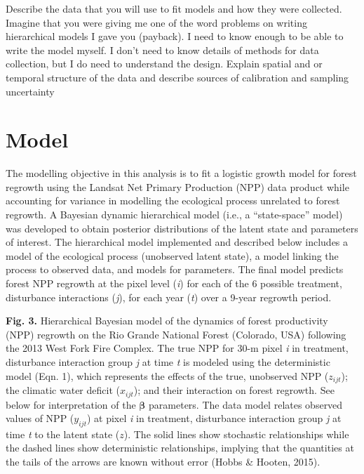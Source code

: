 \documentclass[
]{article}
\begin{document}
Describe the data that you will use to fit models and how they were
collected. Imagine that you were giving me one of the word problems on
writing hierarchical models I gave you (payback). I need to know enough
to be able to write the model myself. I don't need to know details of
methods for data collection, but I do need to understand the design.
Explain spatial and or temporal structure of the data and describe
sources of calibration and sampling uncertainty

\hypertarget{model}{%
\section{Model}\label{model}}

The modelling objective in this analysis is to fit a logistic growth
model for forest regrowth using the Landsat Net Primary Production (NPP)
data product while accounting for variance in modelling the ecological
process unrelated to forest regrowth. A Bayesian dynamic hierarchical
model (i.e., a ``state-space'' model) was developed to obtain posterior
distributions of the latent state and parameters of interest. The
hierarchical model implemented and described below includes a model of
the ecological process (unobserved latent state), a model linking the
process to observed data, and models for parameters. The final model
predicts forest NPP regrowth at the pixel level (\emph{i}) for each of
the 6 possible treatment, disturbance interactions (\emph{j}), for each
year (\emph{t}) over a 9-year regrowth period.

\textbf{Fig. 3.} Hierarchical Bayesian model of the dynamics of forest
productivity (NPP) regrowth on the Rio Grande National Forest (Colorado,
USA) following the 2013 West Fork Fire Complex. The true NPP for 30-m
pixel \emph{i} in treatment, disturbance interaction group \emph{j} at
time \emph{t} is modeled using the deterministic model (Eqn. 1), which
represents the effects of the true, unobserved NPP (\(z_{ijt}\)); the
climatic water deficit (\(x_{ijt}\)); and their interaction on forest
regrowth. See below for interpretation of the \(\boldsymbol{\beta}\)
parameters. The data model relates observed values of NPP (\(y_{ijt}\))
at pixel \emph{i} in treatment, disturbance interaction group \emph{j}
at time \emph{t} to the latent state (\(z\)). The solid lines show
stochastic relationships while the dashed lines show deterministic
relationships, implying that the quantities at the tails of the arrows
are known without error (Hobbs \& Hooten, 2015).
\end{document}
